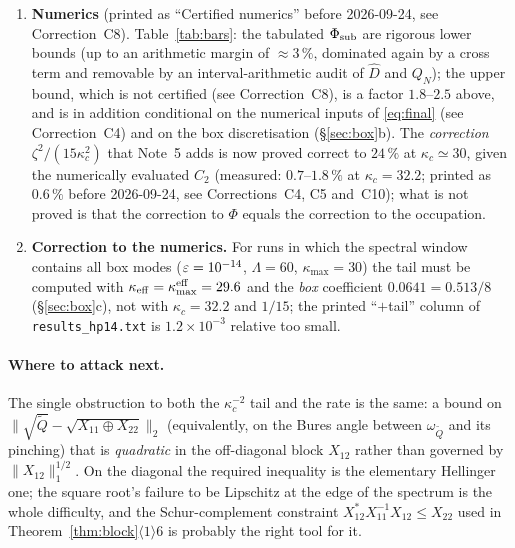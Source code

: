 \documentclass[11pt]{article}
\begin{document}
\begin{enumerate}[leftmargin=1.6em]
Problem~7.2 in its stated form ($Ce^{\kappa_c}\zeta^3$) the two requirements
$\kappa_c>2\log\frac1\zeta$ (from the tail bound) and $\kappa_c<\log\frac1\zeta$ (from the cubic
estimate) are incompatible; a strengthening to $Ce^{c\kappa_c}\zeta^3$ with $c<\frac12$ yields
$\Phi=f_2\zeta^2[1+O(\log^{-1}(1/\zeta))]$ --- still one logarithm short of the $\log^{-2}$ rate claimed by an earlier version of Note~5, Cor.~4.3 (printed as ``Cor.~4.2'' before 2026-09-24; the current version says that this rate was wrong, see Correction~C9)
(Proposition~\ref{prop:rate}).
\item \textbf{Numerics} (printed as ``Certified numerics'' before 2026-09-24, see Correction~C8).  Table~\ref{tab:bars}: the tabulated $\Phi_{\rm sub}$ are rigorous
lower bounds (up to an arithmetic margin of $\approx3\,\%$, dominated again by a cross term and
removable by an interval-arithmetic audit of $\widehat D$ and $Q_N$); the upper bound, which is not certified (see Correction~C8), is a
factor $1.8$--$2.5$ above, and is in addition conditional on the numerical inputs of \eqref{eq:final} (see Correction~C4) and on the box discretisation
(\S\ref{sec:box}b).  The \emph{correction} $\zeta^2/(15\kappa_c^2)$ that Note~5 adds is now proved
correct to $24\,\%$ at $\kappa_c\simeq30$, given the numerically evaluated $C_2$ (measured: $0.7$--$1.8\,\%$ at $\kappa_c=32.2$; printed as $0.6\,\%$ before 2026-09-24, see Corrections~C4, C5 and~C10); what is not proved is that the correction to $\Phi$ equals
the correction to the occupation.
\item \textbf{Correction to the numerics.}  For runs in which the spectral window contains all box
modes ($\varepsilon=10^{-14}$, $\Lambda=60$, $\kappa_{\max}=30$) the tail must be computed with
$\kappa_{\rm eff}=\kappa_{\max}^{\rm eff}=29.6$ and the \emph{box} coefficient
$0.0641=0.513/8$ (\S\ref{sec:box}c), not with $\kappa_c=32.2$ and $1/15$; the printed
``$+$tail'' column of \texttt{results\_hp14.txt} is $1.2\times10^{-3}$ relative too small.
\end{enumerate}

\paragraph{Where to attack next.}  The single obstruction to both the $\kappa_c^{-2}$ tail and the
rate is the same: a bound on $\|\sqrt{\widetilde Q}-\sqrt{X_{11}\oplus X_{22}}\|_2$ (equivalently, on
the Bures angle between $\omega_{\widetilde Q}$ and its pinching) that is \emph{quadratic} in the
off-diagonal block $X_{12}$ rather than governed by $\|X_{12}\|_1^{1/2}$.  On the diagonal the
required inequality is the elementary Hellinger one; the square root's failure to be Lipschitz at the
edge of the spectrum is the whole difficulty, and the Schur-complement constraint
$X_{12}^*X_{11}^{-1}X_{12}\le X_{22}$ used in Theorem~\ref{thm:block}$\langle1\rangle6$ is probably the
right tool for it.
\end{document}
